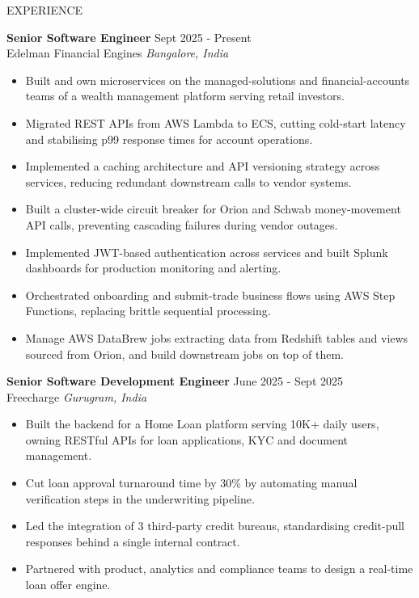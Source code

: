 \documentclass[a4paper,11pt]{resume-openfont}
\begin{document}
\begin{rSection}{EXPERIENCE}

\textbf{Senior Software Engineer} \hfill Sept 2025 - Present \\
Edelman Financial Engines \hfill \textit{Bangalore, India}
\begin{itemize}
    \item Built and own microservices on the managed-solutions and financial-accounts teams of a wealth management platform serving retail investors.
    \item Migrated REST APIs from AWS Lambda to ECS, cutting cold-start latency and stabilising p99 response times for account operations.
    \item Implemented a caching architecture and API versioning strategy across services, reducing redundant downstream calls to vendor systems.
    \item Built a cluster-wide circuit breaker for Orion and Schwab money-movement API calls, preventing cascading failures during vendor outages.
    \item Implemented JWT-based authentication across services and built Splunk dashboards for production monitoring and alerting.
    \item Orchestrated onboarding and submit-trade business flows using AWS Step Functions, replacing brittle sequential processing.
    \item Manage AWS DataBrew jobs extracting data from Redshift tables and views sourced from Orion, and build downstream jobs on top of them.
\end{itemize}

\textbf{Senior Software Development Engineer} \hfill June 2025 - Sept 2025 \\
Freecharge \hfill \textit{Gurugram, India}
\begin{itemize}
    \item Built the backend for a Home Loan platform serving 10K+ daily users, owning RESTful APIs for loan applications, KYC and document management.
    \item Cut loan approval turnaround time by 30\% by automating manual verification steps in the underwriting pipeline.
    \item Led the integration of 3 third-party credit bureaus, standardising credit-pull responses behind a single internal contract.
    \item Partnered with product, analytics and compliance teams to design a real-time loan offer engine.
\end{itemize}


\end{rSection}
\end{document}

